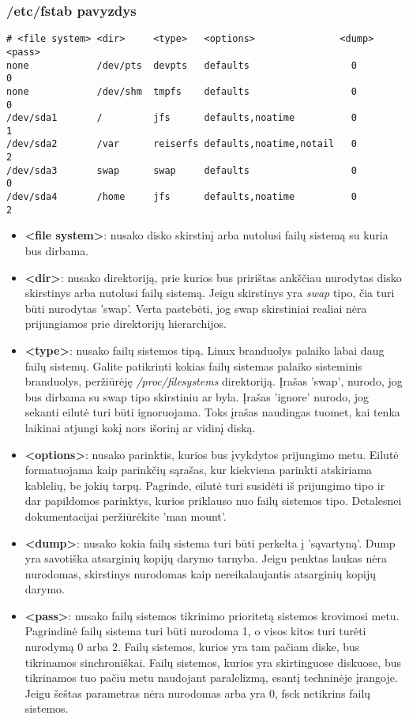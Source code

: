 \subsubsection{/etc/fstab pavyzdys}

\begin{verbatim}
# <file system> <dir>     <type>   <options>               <dump>    <pass>
none            /dev/pts  devpts   defaults                  0         0
none            /dev/shm  tmpfs    defaults                  0         0
/dev/sda1       /         jfs      defaults,noatime          0         1
/dev/sda2       /var      reiserfs defaults,noatime,notail   0         2
/dev/sda3       swap      swap     defaults                  0         0
/dev/sda4       /home     jfs      defaults,noatime          0         2
\end{verbatim}

\begin{itemize}
  \item \textbf{<file system>}: nusako disko skirstinį arba nutolusi
    failų sistemą su kuria bus dirbama. 
  \item \textbf{<dir>}: nusako direktoriją, prie kurios bus pririštas
    ankščiau nurodytas disko skirstinys arba nutolusi failų
    sistemą. Jeigu skirstinys yra \textsl{swap} tipo, čia turi būti
    nurodytas 'swap'. Verta pastebėti, jog swap skirstiniai realiai
    nėra prijungiamos prie direktorijų hierarchijos.
  \item \textbf{<type>}: nusako failų sistemos tipą. Linux branduolys
    palaiko labai daug failų sistemų. Galite patikrinti kokias failų
    sistemas palaiko sisteminis branduolys, peržiūrėję
    \textsl{/proc/filesystems} direktoriją. Įrašas 'swap', nurodo, jog
    bus dirbama su swap tipo skirstiniu ar byla. Įrašas 'ignore'
    nurodo, jog sekanti eilutė turi būti ignoruojama. Toks įrašas
    naudingas tuomet, kai tenka laikinai atjungi kokį nors išorinį ar
    vidinį diską.
  \item \textbf{<options>}: nusako parinktis, kurios bus įvykdytos
    prijungimo metu. Eilutė formatuojama kaip parinkčių sąrašas, kur
    kiekviena parinkti atskiriama kablelių, be jokių tarpų. Pagrinde,
    eilutė turi susidėti iš prijungimo tipo ir dar papildomos
    parinktys, kurios priklauso nuo failų sistemos tipo. Detalesnei
    dokumentacijai peržiūrėkite 'man mount'.
  \item \textbf{<dump>}: nusako kokia failų sistema turi būti perkelta
    į 'sąvartyną'. Dump yra savotiška atsarginių kopijų darymo
    tarnyba. Jeigu penktas laukas nėra nurodomas, skirstinys nurodomas
    kaip nereikalaujantis atsarginių kopijų darymo. 
  \item \textbf{<pass>}: nusako failų sistemos tikrinimo prioritetą
    sistemos krovimosi metu. Pagrindinė failų sistema turi būti
    nurodoma 1, o visos kitos turi turėti nurodymą 0 arba 2. Failų
    sistemos, kurios yra tam pačiam diske, bus tikrinamos
    sinchroniškai. Failų sistemos, kurios yra skirtinguose
    diskuose, bus tikrinamos tuo pačiu metu naudojant paralelizmą,
    esantį techninėje įrangoje. Jeigu šeštas parametras nėra nurodomas
    arba yra 0, fsck netikrins failų sistemos. 
\end{itemize}

